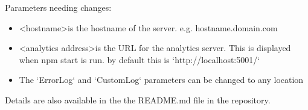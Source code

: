 Parameters needing changes:

\begin{itemize}
\item \textless hostname\textgreater is the hostname of the server. e.g. hostname.domain.com
\item \textless analytics address\textgreater is the URL for the analytics server. This is displayed when npm start is run. by default this is `http://localhost:5001/`
\item The `ErrorLog` and `CustomLog` parameters can be changed to any location
\end{itemize}

Details are also available in the the README.md file in the repository.